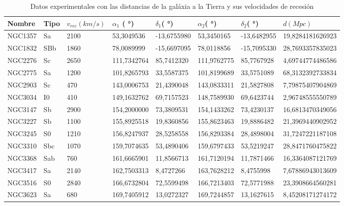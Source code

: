 \documentclass[a4paper,12pt]{article}
\begin{document}
\begin{table}[h!]
    \label{Tabla}
    \caption{Datos experimentales con las distancias de la galáxia a la Tierra y sus velocidades de recesión}

    \hskip-2.5cm
    \begin{tabular}{|l|l|l|l|l|l|l|l|}
    \hline
        Nombre & Tipo & $v_{rec}(km/s)$ & $\alpha_1$ ( °)& $\delta_1$( °) & $\alpha_2$( °) & $\delta_2$( °) &  $d(Mpc)$\\ \hline
        NGC1357 & Sa & 2100 & 53,3049536 & -13,6755980 & 53,3450165 & -13,6482955 & 19,8284181626923 \\ \hline
        NGC1832 & SBb & 1860 & 78,0089999 & -15,6697095 & 78,0118856 & -15,7095330 & 28,7693357835023 \\ \hline
        NGC2276 & Sc & 2650 & 111,7342764 & 85,7412320 & 111,9762775 & 85,7767928 & 4,69744774486586 \\ \hline
        NGC2775 & Sa & 1200 & 101,8265793 & 33,5587375 & 101,8199689 & 33,5751089 & 68,3132392733834 \\ \hline
        NGC2903 & Sc & 470 & 143,0006753 & 21,4390048 & 143,0833311 & 21,5827808 & 7,79875407904869 \\ \hline
        NGC3034 & I0 & 410 & 149,1632762 & 69,7157523 & 148,7589930 & 69,6423744 & 2,96748555550789 \\ \hline
        NGC3147 & Sb & 2900 & 154,2000000 & 73,3809531 & 154,1433262 & 73,4230137 & 16,6813470349056 \\ \hline
        NGC3227 & Sb & 1100 & 155,8925518 & 19,8360856 & 155,8623463 & 19,8886482 & 21,3969440902952 \\ \hline
        NGC3245 & S0 & 1210 & 156,8247937 & 28,5258558 & 156,8293384 & 28,4898004 & 31,7247221187108 \\ \hline
        NGC3310 & Sbc & 1070 & 159,7074635 & 53,4890406 & 159,6797433 & 53,5219247 & 28,8471760475822 \\ \hline
        NGC3368 & Sab & 760 & 161,6665901 & 11,8566713 & 161,7120194 & 11,7871466 & 16,3364087121769 \\ \hline
        NGC3417 & Sa & 2140 & 162,7503313 & 8,4727266 & 163,7628212 & 8,4755998 & 7,67886943013609 \\ \hline
        NGC3516 & S0 & 2840 & 166,6732804 & 72,5599498 & 166,7213403 & 72,5771988 & 23,3908664560281 \\ \hline
        NGC3623 & Sa & 680 & 169,7405912 & 13,0272327 & 169,7244857 & 13,1627615 & 8,45208171274172 \\ \hline

\end{tabular}
\end{table}
\end{document}
